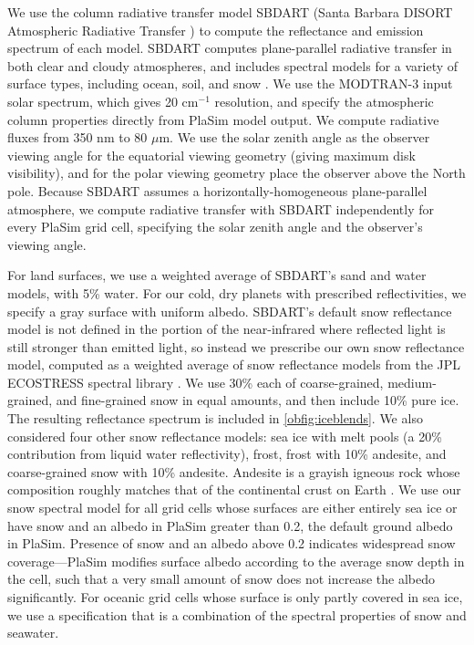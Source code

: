 \documentclass[fleqn,usenatbib]{mnras}
\begin{document}
We use the column radiative transfer model SBDART (Santa Barbara DISORT Atmospheric Radiative Transfer \citep{disort,Ricchiazzi1998,modtran}) to compute the reflectance and emission spectrum of each model. SBDART computes plane-parallel radiative transfer in both clear and cloudy atmospheres, and includes spectral models for a variety of surface types, including ocean, soil, and snow \citep{disort,Ricchiazzi1998,modtran}. We use the MODTRAN-3 input solar spectrum, which gives 20 cm$^{-1}$ resolution, and specify the atmospheric column properties directly from PlaSim model output. We compute radiative fluxes from 350 nm to 80 $\mu$m. We use the solar zenith angle as the observer viewing angle for the equatorial viewing geometry (giving maximum disk visibility), and for the polar viewing geometry place the observer above the North pole. Because SBDART assumes a horizontally-homogeneous plane-parallel atmosphere, we compute radiative transfer with SBDART independently for every PlaSim grid cell, specifying the solar zenith angle and the observer's viewing angle. 

For land surfaces, we use a weighted average of SBDART's sand and water models, with 5\% water. For our cold, dry planets with prescribed reflectivities, we specify a gray surface with uniform albedo. SBDART's default snow reflectance model is not defined in the portion of the near-infrared where reflected light is still stronger than emitted light, so instead we prescribe our own snow reflectance model, computed as a weighted average of snow reflectance models from the JPL ECOSTRESS spectral library \citep{aster,ecostress}. We use 30\% each of coarse-grained, medium-grained, and fine-grained snow in equal amounts, and then include 10\% pure ice. The resulting reflectance spectrum is included in \autoref{obfig:iceblends}. We also considered four other snow reflectance models: sea ice with melt pools (a 20\% contribution from liquid water reflectivity), frost, frost with 10\% andesite, and coarse-grained snow with 10\% andesite. Andesite is a grayish igneous rock whose composition roughly matches that of the continental crust on Earth \citep{andesite,aster,ecostress}. We use our snow spectral model for all grid cells whose surfaces are either entirely sea ice or have snow and an albedo in PlaSim greater than 0.2, the default ground albedo in PlaSim. Presence of snow and an albedo above 0.2 indicates widespread snow coverage---PlaSim modifies surface albedo according to the average snow depth in the cell, such that a very small amount of snow does not increase the albedo significantly. For oceanic grid cells whose surface is only partly covered in sea ice, we use a specification that is a combination of the spectral properties of snow and seawater.
\end{document}
